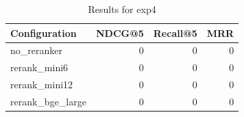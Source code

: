 \begin{table}[htbp]
  \centering
  \caption{Results for exp4}
  \label{tab:exp4}
  \begin{tabular}{lrrr}
    \toprule
    Configuration & NDCG@5 & Recall@5 & MRR \\
    \midrule
    no_reranker & 0 & 0 & 0 \\
    rerank_mini6 & 0 & 0 & 0 \\
    rerank_mini12 & 0 & 0 & 0 \\
    rerank_bge_large & 0 & 0 & 0 \\
    \bottomrule
  \end{tabular}
\end{table}